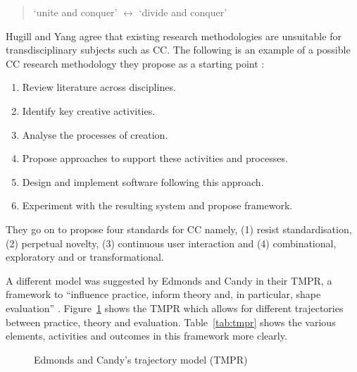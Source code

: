 \begin{quotation}
  `unite and conquer' $\longleftrightarrow$ `divide and conquer' 
\end{quotation}

Hugill and Yang agree that existing research methodologies are unsuitable for transdisciplinary subjects such as \acf{CC}. The following is an example of a possible \ac{CC} research methodology they propose as a starting point \autocite{Hugill2013c}:

\begin{enumerate}
  \item Review literature across disciplines.
  \item Identify key creative activities.
  \item Analyse the processes of creation.
  \item Propose approaches to support these activities and processes.
  \item Design and implement software following this approach.
  \item Experiment with the resulting system and propose framework.
\end{enumerate}

They go on to propose four standards for \ac{CC} \autocite{Hugill2013c} namely, (1) resist standardisation, (2) perpetual novelty, (3) continuous user interaction and (4) combinational, exploratory and or transformational.

A different model was suggested by Edmonds and Candy in their \ac{TMPR}, a framework to ``influence practice, inform theory and, in particular, shape evaluation'' \autocite*{Edmonds2010}. Figure~\ref{fig:tmpr} shows the \ac{TMPR} which allows for different trajectories between practice, theory and evaluation. Table~\ref{tab:tmpr} shows the various elements, activities and outcomes in this framework more clearly.

\begin{figure}[!htbp] %
  \centering
  \caption[Edmonds and Candy's trajectory model]{Edmonds and Candy's trajectory model (TMPR)}
\label{fig:tmpr}
\end{figure}

